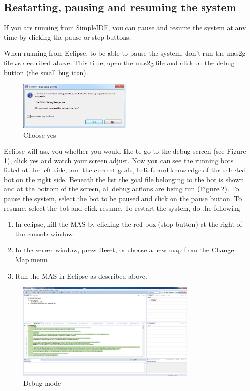 \documentclass[11pt,a4paper]{article}
\begin{document}
\subsection{Restarting, pausing and resuming the system}
If you are running from SimpleIDE, you can pause and resume the system at any time by clicking the pause or step buttons. 

When running from Eclipse, to be able to pause the system, don't run the mas2g file as described above. This time, open the mas2g file and click on the debug button (the small bug icon).

\begin{figure}
  \begin{center}
    \includegraphics[width=0.5\textwidth]{debug.png}
  \end{center}
  \caption{Choose yes}\label{fig:EclipseDebug}
\end{figure}
Eclipse will ask you whether you would like to go to the debug screen (see Figure \ref{fig:EclipseDebug}), click yes and watch your screen adjust.
Now you can see the running bots listed at the left side, and the current goals, beliefs and knowledge of the selected bot on the right side. Beneath the list the goal file belonging to the bot is shown and at the bottom of the screen, all debug actions are being run (Figure \ref{fig:Eclipse}).
To pause the system, select the bot to be paused and click on the pause button. To resume, select the bot and click resume.
To restart the system, do the following
\begin{enumerate}
\item In eclipse, kill the MAS by clicking the red box (stop button) at the right of the console window.
\item In the server window, press Reset, or choose a new map from the Change Map menu.
\item Run the MAS in Eclipse as described above.
\end{enumerate}

\begin{figure}
  \begin{center}
    \includegraphics[width=0.8\textwidth]{debugmode.png}
    \caption{Debug mode}\label{fig:Eclipse}
  \end{center}
\end{figure}
\end{document}
